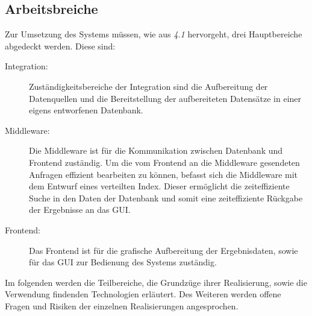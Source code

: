 \subsection{Arbeitsbreiche}
Zur Umsetzung des Systems müssen, wie aus \textit{4.1} hervorgeht, drei Hauptbereiche abgedeckt werden. Diese sind:
\begin{description}
\item[Integration:] Zuständigkeitsbereiche der Integration sind die Aufbereitung der Datenquellen und die Bereitstellung der aufbereiteten Datensätze in einer eigens entworfenen Datenbank.

\item[Middleware:] Die Middleware ist für die Kommunikation zwischen Datenbank und Frontend zuständig. Um die vom Frontend an die Middleware gesendeten Anfragen effizient bearbeiten zu können, befasst sich die Middleware mit dem Entwurf eines verteilten Index. Dieser ermöglicht die zeiteffiziente Suche in den Daten der Datenbank und somit eine zeiteffiziente Rückgabe der Ergebnisse an das GUI.

\item[Frontend:] Das Frontend ist für die grafische Aufbereitung der Ergebnisdaten, sowie für das GUI zur Bedienung des Systems zuständig.
\end{description}
Im folgenden werden die Teilbereiche, die Grundzüge ihrer Realisierung, sowie die Verwendung findenden Technologien erläutert. Des Weiteren werden offene Fragen und Risiken der einzelnen Realisierungen angesprochen.

\newpage